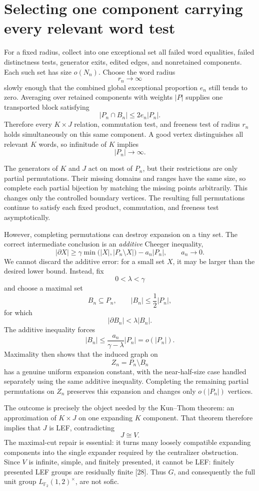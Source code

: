 \documentclass[10pt,openany]{book}
\newcommand{\refnum}[1]{\textnormal{[#1]}}
\begin{document}
\section{Selecting one component carrying every relevant word test}

For a fixed radius, collect into one exceptional set all failed word equalities, failed distinctness tests, generator exits, edited edges, and nonretained components. Each such set has size $o(N_n)$. Choose the word radius
\[
 r_n\longrightarrow\infty
\]
slowly enough that the combined global exceptional proportion $e_n$ still tends to zero. Averaging over retained components with weights $|P|$ supplies one transported block satisfying
\[
 |P_n\cap B_n|\le2e_n|P_n|.
\]
Therefore every $K\times J$ relation, commutation test, and freeness test of radius $r_n$ holds simultaneously on this same component. A good vertex distinguishes all relevant $K$ words, so infinitude of $K$ implies
\[
 |P_n|\longrightarrow\infty.
\]

The generators of $K$ and $J$ act on most of $P_n$, but their restrictions are only partial permutations. Their missing domains and ranges have the same size, so complete each partial bijection by matching the missing points arbitrarily. This changes only the controlled boundary vertices. The resulting full permutations continue to satisfy each fixed product, commutation, and freeness test asymptotically.

However, completing permutations can destroy expansion on a tiny set. The correct intermediate conclusion is an \emph{additive} Cheeger inequality,
\[
 |\partial X|\ge\gamma\min\bigl(|X|,|P_n\setminus X|\bigr)-a_n|P_n|,
 \qquad
 a_n\longrightarrow0.
\]
We cannot discard the additive error: for a small set $X$, it may be larger than the desired lower bound. Instead, fix
\[
 0<\lambda<\gamma
\]
and choose a maximal set
\[
 B_n\subseteq P_n,
 \qquad
 |B_n|\le\frac12|P_n|,
\]
for which
\[
 |\partial B_n|<\lambda|B_n|.
\]
The additive inequality forces
\[
 |B_n|\le\frac{a_n}{\gamma-\lambda}|P_n|=o(|P_n|).
\]
Maximality then shows that the induced graph on
\[
 Z_n=P_n\setminus B_n
\]
has a genuine uniform expansion constant, with the near-half-size case handled separately using the same additive inequality. Completing the remaining partial permutations on $Z_n$ preserves this expansion and changes only $o(|P_n|)$ vertices.

The outcome is precisely the object needed by the Kun--Thom theorem: an approximation of $K\times J$ on one expanding $K$ component. That theorem therefore implies that $J$ is LEF, contradicting
\[
 J\cong V.
\]
The maximal-cut repair is essential: it turns many loosely compatible expanding components into the single expander required by the centralizer obstruction. Since $V$ is infinite, simple, and finitely presented, it cannot be LEF: finitely presented LEF groups are residually finite \refnum{28}. Thus $G$, and consequently the full unit group $L_{\mathbb{F}_2}(1,2)^\times$, are not sofic.
\end{document}
